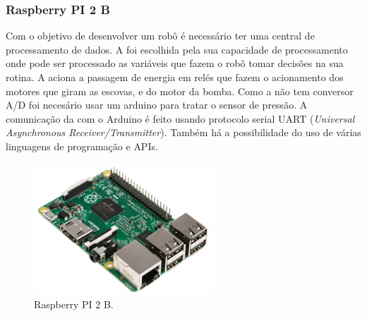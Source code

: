 \subsubsection{Raspberry PI 2 B}
Com o objetivo de desenvolver um robô é necessário ter uma central de processamento de dados. A \rasp  foi escolhida pela sua capacidade de processamento onde pode ser processado as variáveis que fazem o robô tomar decisões na sua rotina. A \rasp aciona a passagem de energia em  relés que fazem o acionamento dos motores que giram as escovas, e do motor da bomba. Como a \rasp não tem conversor A/D foi necesário usar um arduino para tratar o sensor de pressão. A comunicação da \rasp com o Arduino é feito usando protocolo serial  \textsf{UART} (\textit{Universal Asynchronous Receiver/Transmitter}). Também há a possibilidade do uso de várias linguagens de programação e \textsf{APIs}.
\par
\begin{figure}[h]
  \centering
  \includegraphics[width=0.6\textwidth]{figures/rpi2b.jpg}
  \caption{Raspberry PI 2 B.}
  \label{fig:schema-eletro-soft}
\end{figure}
\FloatBarrier
\par

